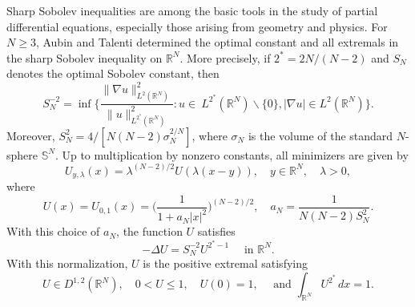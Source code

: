 \documentclass[11pt]{article}
\numberwithin{equation}{section}
\numberwithin{equation}{section}
\begin{document}
	Sharp Sobolev inequalities are among the basic tools in the study of partial differential equations, especially those arising from geometry and physics.  For \(N \ge 3\), Aubin \cite{A1976} and Talenti \cite{T1976} determined the optimal constant and all extremals in the sharp Sobolev inequality on \(\mathbb R^N\). More precisely, if \(2^*=2N/(N-2)\) and \(S_N\) denotes the optimal Sobolev constant, then
	\[
	S_N^{-2}=\inf \bigg\{\frac{\|\nabla u\|_{L^2(\mathbb{R}^N)}^2}{\|u\|_{L^{2^*}(\mathbb{R}^N)}^2}: u \in\  L^{2^*}(\mathbb{R}^N) \backslash\{0\},|\nabla u| \in L^2(\mathbb{R}^N)\bigg\}.
	\]
	Moreover, \(S_N^2=4 /[N(N-2) \sigma_N^{2 / N}]\), where \(\sigma_N\) is the volume of the standard \(N\)-sphere \(\mathbb{S}^N\). Up to multiplication by nonzero constants, all minimizers are given by
	\[
	U_{y, \lambda}(x)=\lambda^{(N-2) / 2} U(\lambda(x-y)),  \quad y \in \mathbb{R}^N, \quad \lambda>0,
	\]
	where
	\[
	U(x)=U_{0, 1}(x) =\Big(\frac{1}{1+a_N|x|^2}\Big)^{(N-2) / 2}, \quad a_N=\frac{1}{N(N-2) S_N^{2}}.
	\]
	With this choice of \(a_N\), the function \(U\) satisfies
	\[
	-\Delta U=S_N^{-2} U^{2^*-1} \quad \text { in } \mathbb{R}^N.
	\]
	With this normalization, \(U\) is the positive extremal satisfying
	\[
	U \in D^{1,2}(\mathbb{R}^N), \quad 0<U \leq 1, \quad U(0)=1, \quad \text{ and }\int_{\mathbb{R}^N} U^{2^*}\,d x=1.
	\]
	
\end{document}
